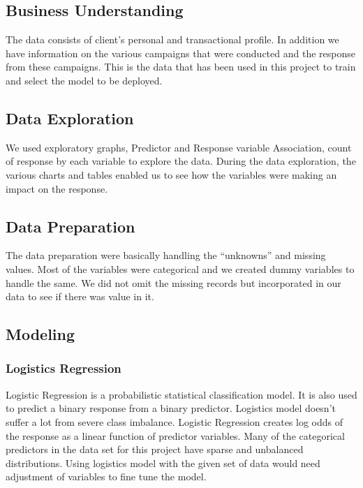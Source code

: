 \documentclass[english,floatsintext,man]{apa6}
\begin{document}
\subsection{Business Understanding}\label{business-understanding}

The data consists of client's personal and transactional profile. In
addition we have information on the various campaigns that were
conducted and the response from these campaigns. This is the data that
has been used in this project to train and select the model to be
deployed.

\subsection{Data Exploration}\label{data-exploration}

We used exploratory graphs, Predictor and Response variable Association,
count of response by each variable to explore the data. During the data
exploration, the various charts and tables enabled us to see how the
variables were making an impact on the response.

\subsection{Data Preparation}\label{data-preparation}

The data preparation were basically handling the \enquote{unknowns} and
missing values. Most of the variables were categorical and we created
dummy variables to handle the same. We did not omit the missing records
but incorporated in our data to see if there was value in it.

\subsection{Modeling}\label{modeling}

\subsubsection{Logistics Regression}\label{logistics-regression}

Logistic Regression is a probabilistic statistical classification model.
It is also used to predict a binary response from a binary predictor.
Logistics model doesn't suffer a lot from severe class imbalance.
Logistic Regression creates log odds of the response as a linear
function of predictor variables. Many of the categorical predictors in
the data set for this project have sparse and unbalanced distributions.
Using logistics model with the given set of data would need adjustment
of variables to fine tune the model.
\end{document}
